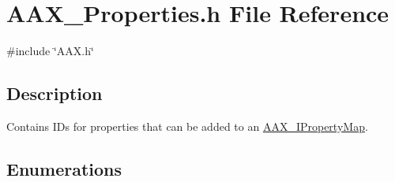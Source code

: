 \hypertarget{a00662}{}\section{A\+A\+X\+\_\+\+Properties.\+h File Reference}
\label{a00662}
{\ttfamily \#include \char`\"{}A\+A\+X.\+h\char`\"{}}\newline


\subsection{Description}
Contains I\+Ds for properties that can be added to an \mbox{\hyperlink{a01869}{A\+A\+X\+\_\+\+I\+Property\+Map}}. 

\subsection*{Enumerations}
